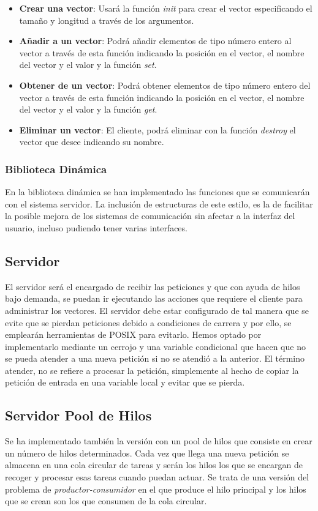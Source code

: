 \documentclass[10pt, spanish, pdftex]{template/UC3M_document}
\begin{document}
\begin{itemize}
  \item \textbf{Crear una vector}: Usará la función \textit{init} para crear el vector especificando el tamaño y longitud a través de los argumentos.
  \item \textbf{Añadir a un vector}: Podrá añadir elementos de tipo número entero al vector a través de esta función indicando la posición en el vector, el nombre del vector y el valor y la función \textit{set}.
  \item \textbf{Obtener de un vector}: Podrá obtener elementos de tipo número entero del vector a través de esta función indicando la posición en el vector, el nombre del vector y el valor y la función \textit{get}.
  \item \textbf{Eliminar un vector}: El cliente, podrá eliminar con la función \textit{destroy} el vector que desee indicando su nombre.
\end{itemize}

\subsubsection{Biblioteca Dinámica}
En la biblioteca dinámica se han implementado las funciones que se comunicarán con el sistema servidor. La inclusión de estructuras de este estilo, es la de facilitar la posible mejora de los sistemas de comunicación sin afectar a la interfaz del usuario, incluso pudiendo tener varias interfaces.

\subsection{Servidor}
El servidor será el encargado de recibir las peticiones y que con ayuda de hilos bajo demanda, se puedan ir ejecutando las acciones que requiere el cliente para administrar los vectores.
El servidor debe estar configurado de tal manera que se evite que se pierdan peticiones debido a condiciones de carrera y por ello, se emplearán herramientas de POSIX para evitarlo. Hemos optado por implementarlo mediante un cerrojo y una variable condicional que hacen que no se pueda atender a una nueva petición si no se atendió a la anterior. El término atender, no se refiere a procesar la petición, simplemente al hecho de copiar la petición de entrada en una variable local y evitar que se pierda.

\subsection{Servidor Pool de Hilos}
Se ha implementado también la versión con un pool de hilos que consiste en crear un número de hilos determinados. Cada vez que llega una nueva petición se almacena en una cola circular de tareas y serán los hilos los que se encargan de recoger y procesar esas tareas cuando puedan actuar. Se trata de una versión del problema de \textit{productor-consumidor} en el que produce el hilo principal y los hilos que se crean son los que consumen de la cola circular.
\end{document}
